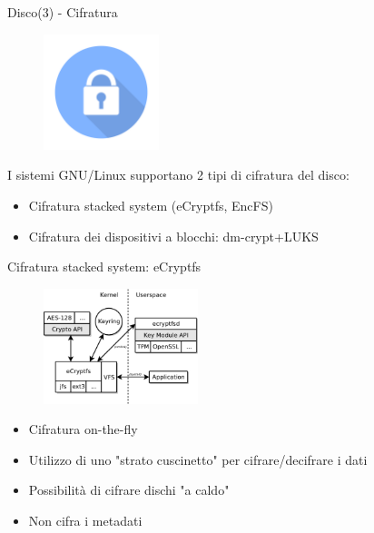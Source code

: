 \begin{frame}{Disco(3) - Cifratura}
    \begin{figure}[h]
        \includegraphics[width=0.3\textwidth]{images/encryption.png}
    \end{figure}
I sistemi GNU/Linux supportano 2 tipi di cifratura del disco:
\begin{itemize}
    \item Cifratura stacked system (eCryptfs, EncFS)
    \item Cifratura dei dispositivi a blocchi: dm-crypt+LUKS
\end{itemize}
\end{frame}


\begin{frame}{Cifratura stacked system: eCryptfs}
    \begin{figure}[h]
        \includegraphics[width=0.4\textwidth]{images/ecryptfs.jpg}
    \end{figure}
\begin{itemize}
    \item Cifratura on-the-fly
    \item Utilizzo di uno "strato cuscinetto" per cifrare/decifrare i dati
    \item Possibilità di cifrare dischi "a caldo"
    \item Non cifra i metadati
\end{itemize}
\end{frame}


